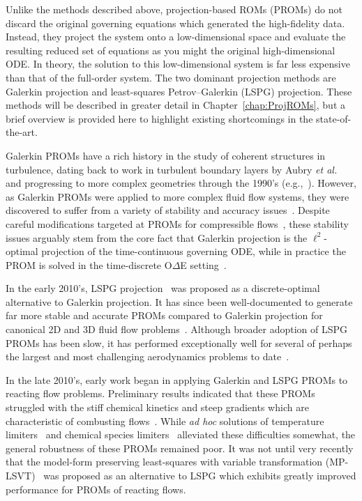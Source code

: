 Unlike the methods described above, projection-based ROMs (PROMs) do not discard the original governing equations which generated the high-fidelity data. Instead, they project the system onto a low-dimensional space and evaluate the resulting reduced set of equations as you might the original high-dimensional ODE. In theory, the solution to this low-dimensional system is far less expensive than that of the full-order system. The two dominant projection methods are Galerkin projection and least-squares Petrov--Galerkin (LSPG) projection. These methods will be described in greater detail in Chapter~\ref{chap:ProjROMs}, but a brief overview is provided here to highlight existing shortcomings in the state-of-the-art.

Galerkin PROMs have a rich history in the study of coherent structures in turbulence, dating back to work in turbulent boundary layers by Aubry \textit{et al.}~\cite{Aubry1988} and progressing to more complex geometries through the 1990's (e.g.,~\cite{Deane1991,Deane1994,Cazemier1998,BuiThanh2007}). However, as Galerkin PROMs were applied to more complex fluid flow systems, they were discovered to suffer from a variety of stability and accuracy issues~\cite{Rempfer2000}. Despite careful modifications targeted at PROMs for compressible flows~\cite{rowleyGpod,Kalashnikova2011}, these stability issues arguably stem from the core fact that Galerkin projection is the $\ell^2$-optimal projection of the time-continuous governing ODE, while in practice the PROM is solved in the time-discrete O$\Delta$E setting~\cite{Grimberg2020}.

In the early 2010's, LSPG projection~\cite{Carlberg2010,Carlberg2013} was proposed as a discrete-optimal alternative to Galerkin projection. It has since been well-documented to generate far more stable and accurate PROMs compared to Galerkin projection for canonical 2D and 3D fluid flow problems~\cite{Carlberg2017}. Although broader adoption of LSPG PROMs has been slow, it has performed exceptionally well for several of perhaps the largest and most challenging aerodynamics problems to date~\cite{Grimberg2021}.

In the late 2010's, early work began in applying Galerkin and LSPG PROMs to reacting flow problems. Preliminary results indicated that these PROMs struggled with the stiff chemical kinetics and steep gradients which are characteristic of combusting flows~\cite{Huang2018a,Huang2018b}. While \textit{ad hoc} solutions of temperature limiters~\cite{Huang2019} and chemical species limiters~\cite{Huang2020} alleviated these difficulties somewhat, the general robustness of these PROMs remained poor.  It was not until very recently that the model-form preserving least-squares with variable transformation (MP-LSVT)~\cite{Huang2022} was proposed as an alternative to LSPG which exhibits greatly improved performance for PROMs of reacting flows.

